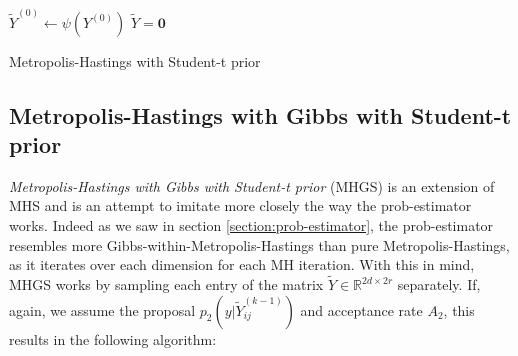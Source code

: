 \documentclass[12pt]{memoir}
\newcommand{\mb}{\mathbf}
\begin{document}
\begin{algorithm}[H]
    \DontPrintSemicolon

    $\tilde Y^{(0)} \gets \psi(Y^{(0)})$\;
    $\tilde Y = \mb 0$\;
    \caption{Metropolis-Hastings with Student-t prior}
\end{algorithm}\medbreak



\subsection*{Metropolis-Hastings with Gibbs with Student-t prior}
\textit{Metropolis-Hastings with Gibbs with Student-t prior} (MHGS) is an extension of MHS and is an attempt to imitate more closely the way the prob-estimator works. Indeed as we saw in section \ref{section:prob-estimator}, the prob-estimator resembles more Gibbs-within-Metropolis-Hastings than pure Metropolis-Hastings, as it iterates over each dimension for each MH iteration. With this in mind, MHGS works by sampling each entry of the matrix $\tilde Y \in \mathbb{R}^{2d\times 2r}$ separately. If, again, we assume the proposal $p_2(y|\tilde Y^{(k-1)}_{ij})$ and acceptance rate $A_2$, this results in the following algorithm:\medbreak
\end{document}
